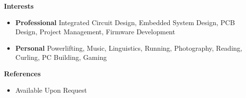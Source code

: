 \documentclass[letterpaper,12pt]{article}[leftmargin=*]
\def \entryspacing {-0pt}
\renewcommand{\section}[2]{\vspace{5pt}
  \colorbox{secondary}{\color{white}\raggedbottom\normalsize\textbf{{#1}{\hspace{7pt}#2}}}
}
\newcommand{\resumeEntryStart}{\begin{itemize}[leftmargin=2.5mm]}
\newcommand{\resumeEntryEnd}{\end{itemize}\vspace{\entryspacing}}
\newcommand{\resumeEntryS}[2]{
  \item[]\small{
    \textbf{\color{primary}#1 }{ #2 \vspace{-6pt}}
  }
}
\begin{document}
\section{}{Interests}

 \resumeEntryStart
  \resumeEntryS{Professional }{Integrated Circuit Design, Embedded System Design, PCB Design, Project Management, Firmware Development}
  \resumeEntryS{Personal }{Powerlifting, Music, Linguistics, Running, Photography, Reading, Curling, PC Building, Gaming}
 \resumeEntryEnd
\section{\faEnvelope}{References}

 \resumeEntryStart
  \resumeEntryS{}{Available Upon Request}
 \resumeEntryEnd
\end{document}
